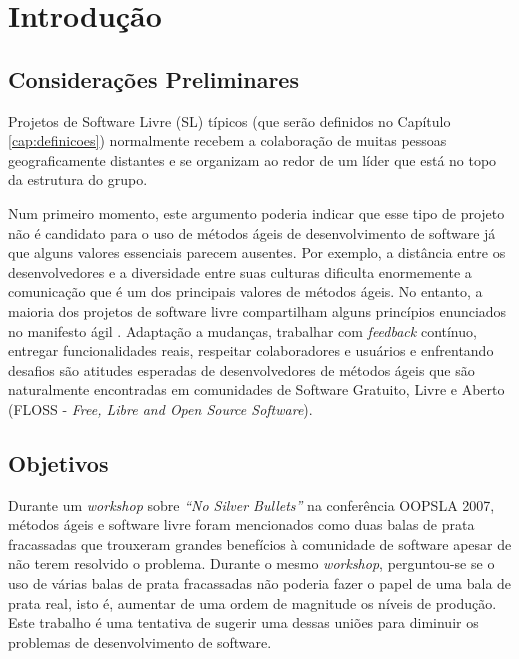 \chapter{Introdução}
\label{cap:introducao}

\section{Considerações Preliminares}
\label{sec:consideracoes_preliminares}

Projetos de Software Livre (SL) típicos (que serão definidos no
Capítulo \ref{cap:definicoes}) normalmente recebem a colaboração de
muitas pessoas geograficamente distantes \cite{Dempsey1999} e se
organizam ao redor de um líder que está no topo da estrutura do grupo.

Num primeiro momento, este argumento poderia indicar que esse tipo de
projeto não é candidato para o uso de métodos ágeis de desenvolvimento
de software já que alguns valores essenciais parecem ausentes. Por
exemplo, a distância entre os desenvolvedores e a diversidade entre
suas culturas dificulta enormemente a comunicação que é um dos
principais valores de métodos ágeis. No entanto, a maioria dos projetos
de software livre compartilham alguns princípios enunciados no
manifesto ágil \cite{AgileManifesto}. Adaptação a mudanças, trabalhar
com \emph{feedback} contínuo, %
entregar funcionalidades reais, respeitar colaboradores e usuários e
enfrentando desafios são atitudes esperadas de desenvolvedores de
métodos ágeis que são naturalmente encontradas em comunidades de
Software Gratuito, Livre e Aberto (FLOSS - \emph{Free, Libre and Open
  Source Software}). %


\section{Objetivos}
\label{sec:objetivo}

Durante um \emph{workshop} \cite{OOPSLA07} sobre \emph{``No Silver
  Bullets''} \cite{Broks1987} na conferência OOPSLA 2007, métodos
ágeis e software livre foram mencionados como duas balas de prata
fracassadas que trouxeram grandes benefícios à comunidade de software
apesar de não terem resolvido o problema. Durante o mesmo
\emph{workshop}, perguntou-se se o uso de várias balas de prata
fracassadas não poderia fazer o papel de uma bala de prata real, isto
é, aumentar de uma ordem de magnitude os níveis de produção. Este
trabalho é uma tentativa de sugerir uma dessas uniões para diminuir os
problemas de desenvolvimento de software.

